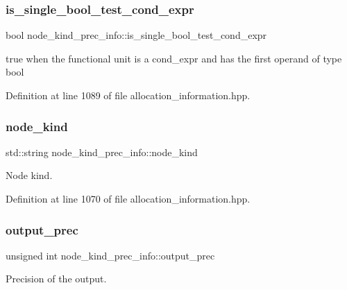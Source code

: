 \subsubsection{\texorpdfstring{is\+\_\+single\+\_\+bool\+\_\+test\+\_\+cond\+\_\+expr}{is\_single\_bool\_test\_cond\_expr}}
{\footnotesize\ttfamily bool node\+\_\+kind\+\_\+prec\+\_\+info\+::is\+\_\+single\+\_\+bool\+\_\+test\+\_\+cond\+\_\+expr}



true when the functional unit is a cond\+\_\+expr and has the first operand of type bool 



Definition at line 1089 of file allocation\+\_\+information.\+hpp.

\mbox{\label{structnode__kind__prec__info_a14cf0117c5846e1a593aa9fd329496c0}} 
\subsubsection{\texorpdfstring{node\+\_\+kind}{node\_kind}}
{\footnotesize\ttfamily std\+::string node\+\_\+kind\+\_\+prec\+\_\+info\+::node\+\_\+kind}



Node kind. 



Definition at line 1070 of file allocation\+\_\+information.\+hpp.

\mbox{\label{structnode__kind__prec__info_a080975025ea47c64fd2201007c4a2ecb}} 
\subsubsection{\texorpdfstring{output\+\_\+prec}{output\_prec}}
{\footnotesize\ttfamily unsigned int node\+\_\+kind\+\_\+prec\+\_\+info\+::output\+\_\+prec}



Precision of the output. 



